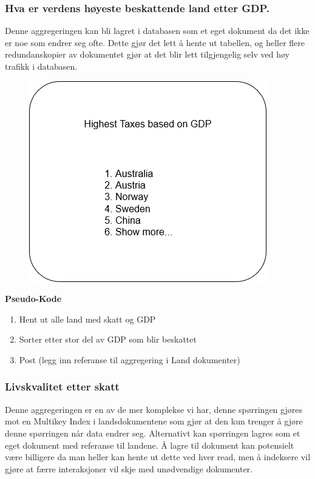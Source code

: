 \subsubsection{Hva er verdens høyeste beskattende land etter GDP.}
Denne aggregeringen kan bli lagret i databasen som et eget dokument da det ikke er noe som endrer seg ofte. Dette gjør det lett å hente ut tabellen, og heller flere redundanskopier av dokumentet gjør at det blir lett tilgjengelig selv ved høy trafikk i databasen.

\FigureCounter
\begin{figure}[H]
  \includegraphics[scale=1]{images/milepael3/highestTaxesByGDP.png}
\end{figure}

\textbf{Pseudo-Kode}
\begin{enumerate}
  \item Hent ut alle land med skatt og GDP
  \item Sorter etter stor del av GDP som blir beskattet
  \item Post (legg inn referanse til aggregering i Land dokumenter)
\end{enumerate}

\subsubsection{Livskvalitet etter skatt}
Denne aggregeringen er en av de mer komplekse vi har, denne spørringen gjøres mot en Multikey Index i landsdokumentene som gjør at den kun trenger å gjøre denne spørringen når data endrer seg. Alternativt kan spørringen lagres som et eget dokument med referanse til landene. Å lagre til dokument kan potensielt være billigere da man heller kan hente ut dette ved hver read, men å indeksere vil gjøre at færre interaksjoner vil skje med unødvendige dokumenter.

